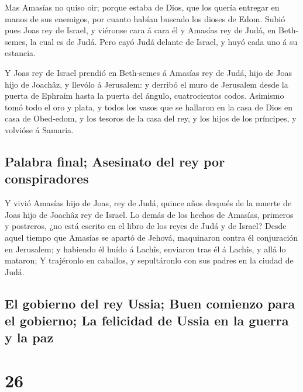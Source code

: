  Mas Amasías no quiso oir; porque estaba de Dios, que los
quería entregar en manos de sus enemigos, por cuanto habían buscado los
dioses de Edom.  Subió pues Joas rey de Israel, y
viéronse cara á cara él y Amasías rey de Judá, en Beth-semes, la cual es
de Judá.  Pero cayó Judá delante de Israel, y huyó cada
uno á su estancia.

 Y Joas rey de Israel prendió en Beth-semes á Amasías rey
de Judá, hijo de Joas hijo de Joachâz, y llevólo á Jerusalem: y derribó
el muro de Jerusalem desde la puerta de Ephraim hasta la puerta del
ángulo, cuatrocientos codos.  Asimismo tomó todo el oro y
plata, y todos los vasos que se hallaron en la casa de Dios en casa de
Obed-edom, y los tesoros de la casa del rey, y los hijos de los
príncipes, y volvióse á Samaria.

\hypertarget{palabra-final-asesinato-del-rey-por-conspiradores}{%
\subsection{Palabra final; Asesinato del rey por
conspiradores}\label{palabra-final-asesinato-del-rey-por-conspiradores}}

 Y vivió Amasías hijo de Joas, rey de Judá, quince años
después de la muerte de Joas hijo de Joachâz rey de Israel.
 Lo demás de los hechos de Amasías, primeros y postreros,
¿no está escrito en el libro de los reyes de Judá y de Israel?
 Desde aquel tiempo que Amasías se apartó de Jehová,
maquinaron contra él conjuración en Jerusalem; y habiendo él huído á
Lachîs, enviaron tras él á Lachîs, y allá lo mataron;  Y
trajéronlo en caballos, y sepultáronlo con sus padres en la ciudad de
Judá.

\hypertarget{el-gobierno-del-rey-ussia-buen-comienzo-para-el-gobierno-la-felicidad-de-ussia-en-la-guerra-y-la-paz}{%
\subsection{El gobierno del rey Ussia; Buen comienzo para el gobierno;
La felicidad de Ussia en la guerra y la
paz}\label{el-gobierno-del-rey-ussia-buen-comienzo-para-el-gobierno-la-felicidad-de-ussia-en-la-guerra-y-la-paz}}

\hypertarget{section-25}{%
\section{26}\label{section-25}}

